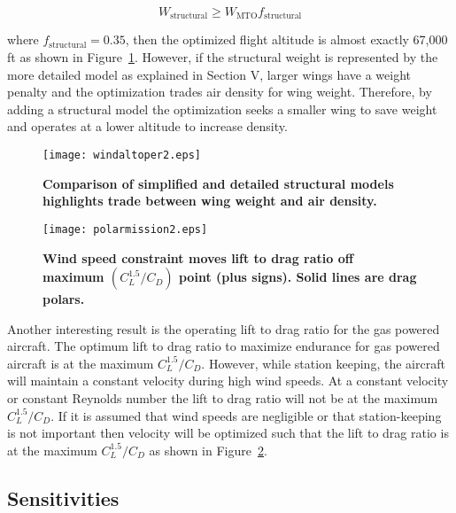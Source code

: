 \begin{equation}
    W_{\text{structural}} \geq W_{\text{MTO}} f_{\text{structural}}
\end{equation}

where $f_{\text{structural}} = 0.35$, then the optimized flight altitude is almost exactly 67,000 ft as shown in Figure~\ref{f:altoper}.  
However, if the structural weight is represented by the more detailed model as explained in Section V, larger wings have a weight penalty and the optimization trades air density for wing weight.
Therefore, by adding a structural model the optimization seeks a smaller wing to save weight and operates at a lower altitude to increase density. 

\begin{figure}[h!]
	\begin{center}
	\texttt{[image: windaltoper2.eps]}
 \caption{\textbf{Comparison of simplified and detailed structural models highlights trade between wing weight and air density.}}
 \label{f:altoper}
	\end{center}
\end{figure}

\begin{figure}[h!]
	\begin{center}
	\texttt{[image: polarmission2.eps]}
    \caption{\textbf{Wind speed constraint moves lift to drag ratio off maximum $(C_L^{1.5}/C_D)$ point (plus signs). Solid lines are drag polars.}}
 \label{f:polarmission}
	\end{center}
\end{figure}

Another interesting result is the operating lift to drag ratio for the gas powered aircraft.  
The optimum lift to drag ratio to maximize endurance for gas powered aircraft is at the maximum $C_L^{1.5}/C_D$.\cite{br2}  
However, while station keeping, the aircraft will maintain a constant velocity during high wind speeds.  
At a constant velocity or constant Reynolds number the lift to drag ratio will not be at the maximum $C_L^{1.5}/C_D$.  
If it is assumed that wind speeds are negligible or that station-keeping is not important then velocity will be optimized such that the lift to drag ratio is at the maximum $C_L^{1.5}/C_D$ as shown in Figure~\ref{f:polarmission}.


\subsection{Sensitivities}

